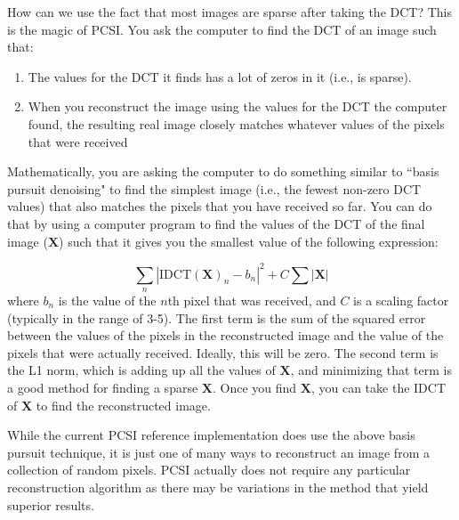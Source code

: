 \documentclass[letterpaper]{article}
\begin{document}
How can we use the fact that most images are sparse after taking the DCT? This is the magic of PCSI. You ask the computer to find the DCT of an image such that:
\begin{enumerate}
    \item The values for the DCT it finds has a lot of zeros in it (i.e., is sparse).
    \item When you reconstruct the image using the values for the DCT the computer found, the resulting real image closely matches whatever values of the pixels that were received
\end{enumerate}

Mathematically, you are asking the computer to do something similar to ``basis pursuit denoising" to find the simplest image (i.e., the fewest non-zero DCT values) that also matches the pixels that you have received so far. You can do that by using a computer program to find the values of the DCT of the final image ($\mathbf{X}$) such that it gives you the smallest value of the following expression:

\begin{equation}
    \sum_n{ | \text{IDCT}(\mathbf{X})_n- b_n |^2} + C\sum{|\mathbf{X}|}
\end{equation}
where $b_n$ is the value of the $n$th pixel that was received, and $C$ is a scaling factor (typically in the range of 3-5). The first term is the sum of the squared error between the values of the pixels in the reconstructed image and the value of the pixels that were actually received. Ideally, this will be zero. The second term is the L1 norm, which is adding up all the values of $\mathbf{X}$, and minimizing that term is a good method for finding a sparse $\mathbf{X}$. Once you find $\mathbf{X}$, you can take the IDCT of $\mathbf{X}$ to find the reconstructed image.

While the current PCSI reference implementation does use the above basis pursuit technique, it is just one of many ways to reconstruct an image from a collection of random pixels. PCSI actually does not require any particular reconstruction algorithm as there may be variations in the method that yield superior results.
\end{document}
